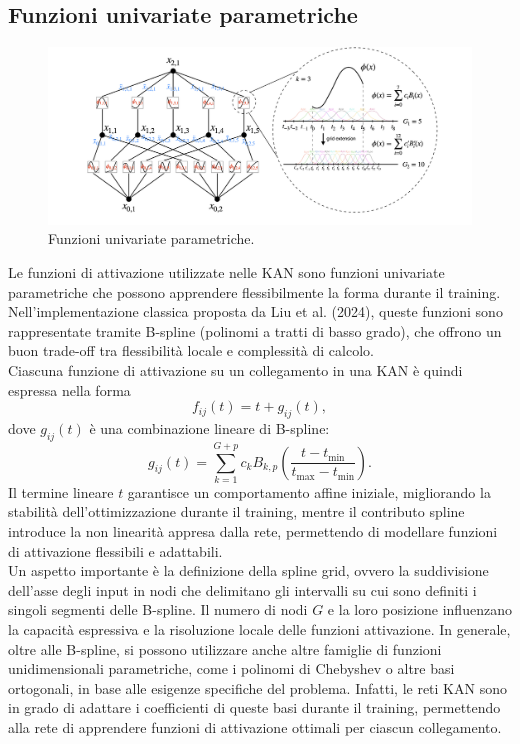 \documentclass[a4paper,12pt]{report}
\begin{document}
	\subsection{Funzioni univariate parametriche}
	
	\begin{figure}[H]
		\centering
		\includegraphics[width=1.0\textwidth]{img/fup.png}
		\caption{Funzioni univariate parametriche.}
	\end{figure}
	
	Le funzioni di attivazione utilizzate nelle KAN sono funzioni univariate parametriche che possono apprendere flessibilmente la forma durante il training. Nell’implementazione classica proposta da Liu et al. (2024), queste funzioni sono rappresentate tramite B-spline (polinomi a tratti di basso grado), che offrono un buon trade-off tra flessibilità locale e complessità di calcolo. \\
	
	Ciascuna funzione di attivazione su un collegamento in una KAN è quindi espressa nella forma
	\[
	f_{ij}(t) = t + g_{ij}(t),
	\]
	dove \(g_{ij}(t)\) è una combinazione lineare di B-spline:
	\[
	g_{ij}(t) = \sum_{k=1}^{G+p} c_k B_{k,p}\left(\frac{t - t_{\min}}{t_{\max} - t_{\min}}\right).
	\]
	Il termine lineare \(t\) garantisce un comportamento affine iniziale, migliorando la stabilità dell'ottimizzazione durante il training, mentre il contributo spline introduce la non linearità appresa dalla rete, permettendo di modellare funzioni di attivazione flessibili e adattabili. \\
	Un aspetto importante è la definizione della spline grid, ovvero la suddivisione dell'asse degli input in nodi che delimitano gli intervalli su cui sono definiti i singoli segmenti delle B-spline. Il numero di nodi \(G\) e la loro posizione influenzano la capacità espressiva e la risoluzione locale delle funzioni attivazione. In generale, oltre alle B-spline, si possono utilizzare anche altre famiglie di funzioni unidimensionali parametriche, come i polinomi di Chebyshev o altre basi ortogonali, in base alle esigenze specifiche del problema. Infatti, le reti KAN sono in grado di adattare i coefficienti di queste basi durante il training, permettendo alla rete di apprendere funzioni di attivazione ottimali per ciascun collegamento.
	
\end{document}
